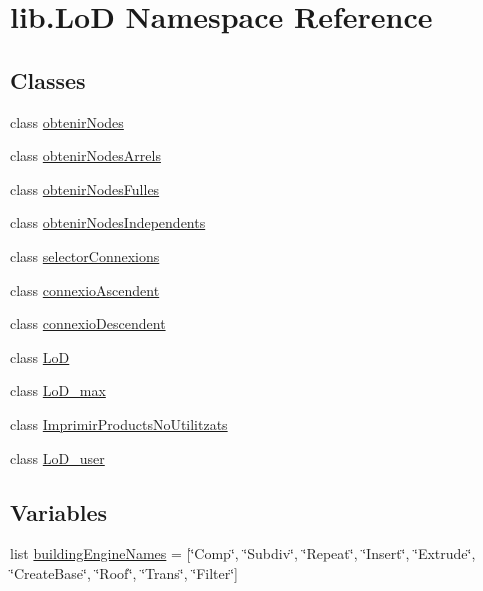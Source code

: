 \hypertarget{namespacelib_1_1_lo_d}{\section{lib.\-Lo\-D Namespace Reference}
\label{namespacelib_1_1_lo_d}
}
\subsection*{Classes}
\begin{DoxyCompactItemize}
\item 
class \hyperlink{classlib_1_1_lo_d_1_1obtenir_nodes}{obtenir\-Nodes}
\item 
class \hyperlink{classlib_1_1_lo_d_1_1obtenir_nodes_arrels}{obtenir\-Nodes\-Arrels}
\item 
class \hyperlink{classlib_1_1_lo_d_1_1obtenir_nodes_fulles}{obtenir\-Nodes\-Fulles}
\item 
class \hyperlink{classlib_1_1_lo_d_1_1obtenir_nodes_independents}{obtenir\-Nodes\-Independents}
\item 
class \hyperlink{classlib_1_1_lo_d_1_1selector_connexions}{selector\-Connexions}
\item 
class \hyperlink{classlib_1_1_lo_d_1_1connexio_ascendent}{connexio\-Ascendent}
\item 
class \hyperlink{classlib_1_1_lo_d_1_1connexio_descendent}{connexio\-Descendent}
\item 
class \hyperlink{classlib_1_1_lo_d_1_1_lo_d}{Lo\-D}
\item 
class \hyperlink{classlib_1_1_lo_d_1_1_lo_d__max}{Lo\-D\-\_\-max}
\item 
class \hyperlink{classlib_1_1_lo_d_1_1_imprimir_products_no_utilitzats}{Imprimir\-Products\-No\-Utilitzats}
\item 
class \hyperlink{classlib_1_1_lo_d_1_1_lo_d__user}{Lo\-D\-\_\-user}
\end{DoxyCompactItemize}
\subsection*{Variables}
\begin{DoxyCompactItemize}
\item 
list \hyperlink{namespacelib_1_1_lo_d_a6674b6ab1b0b27a927bccba1e548010b}{building\-Engine\-Names} = \mbox{[}\char`\"{}Comp\char`\"{}, \char`\"{}Subdiv\char`\"{}, \char`\"{}Repeat\char`\"{}, \char`\"{}Insert\char`\"{}, \char`\"{}Extrude\char`\"{}, \char`\"{}Create\-Base\char`\"{}, \char`\"{}Roof\char`\"{}, \char`\"{}Trans\char`\"{}, \char`\"{}Filter\char`\"{}\mbox{]}
\end{DoxyCompactItemize}


